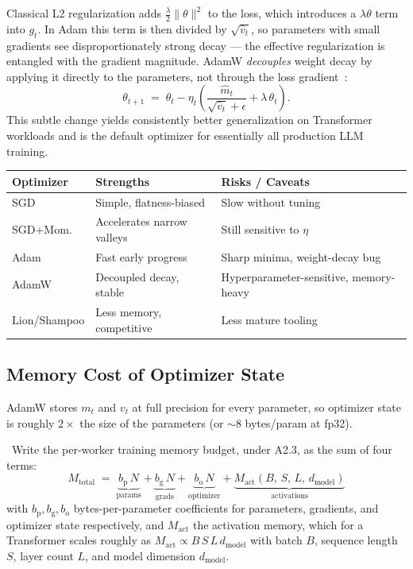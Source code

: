 Classical L2 regularization adds $\tfrac{\lambda}{2}\|\theta\|^2$ to the
loss, which introduces a $\lambda \theta$ term into $g_t$. In Adam this
term is then divided by $\sqrt{\hat v_t}$, so parameters with small
gradients see disproportionately strong decay — the effective
regularization is entangled with the gradient magnitude. AdamW
\emph{decouples} weight decay by applying it directly to the parameters,
not through the loss gradient~\citep{loshchilov2019decoupled}:
\begin{equation}
\label{eq:ch2-adamw-update}
\theta_{t+1} \;=\; \theta_t
  - \eta_t\!\left(\frac{\hat m_t}{\sqrt{\hat v_t} + \epsilon} + \lambda\,\theta_t\right).
\end{equation}
This subtle change yields consistently better generalization on
Transformer workloads and is the default optimizer for essentially all
production LLM training.

\begin{center}
\begin{tabular}{|l|l|l|}
\hline
Optimizer & Strengths & Risks / Caveats \\
\hline
SGD        & Simple, flatness-biased & Slow without tuning \\
SGD+Mom.   & Accelerates narrow valleys & Still sensitive to $\eta$ \\
Adam       & Fast early progress & Sharp minima, weight-decay bug \\
AdamW      & Decoupled decay, stable & Hyperparameter-sensitive, memory-heavy \\
Lion/Shampoo & Less memory, competitive & Less mature tooling \\
\hline
\end{tabular}
\end{center}

\subsection{Memory Cost of Optimizer State}

AdamW stores $m_t$ and $v_t$ at full precision for every parameter, so
optimizer state is roughly $2\times$ the size of the parameters (or
$\sim 8$ bytes/param at fp32).

\Ident\ Write the per-worker training memory budget, under A2.3, as
the sum of four terms:
\begin{equation}
\label{eq:ch2-mem-budget}
\boxed{\;M_{\mathrm{total}}
  \;=\; \underbrace{b_{\mathrm p}\, N}_{\text{params}}
     + \underbrace{b_{\mathrm g}\, N}_{\text{grads}}
     + \underbrace{b_{\mathrm o}\, N}_{\text{optimizer}}
     + \underbrace{M_{\mathrm{act}}(B,\,S,\,L,\,d_{\mathrm{model}})}_{\text{activations}}\;}
\end{equation}
with $b_{\mathrm p}, b_{\mathrm g}, b_{\mathrm o}$ bytes-per-parameter
coefficients for parameters, gradients, and optimizer state
respectively, and $M_{\mathrm{act}}$ the activation memory, which for
a Transformer scales roughly as $M_{\mathrm{act}} \propto
B\,S\,L\,d_{\mathrm{model}}$ with batch $B$, sequence length $S$,
layer count $L$, and model dimension $d_{\mathrm{model}}$.

